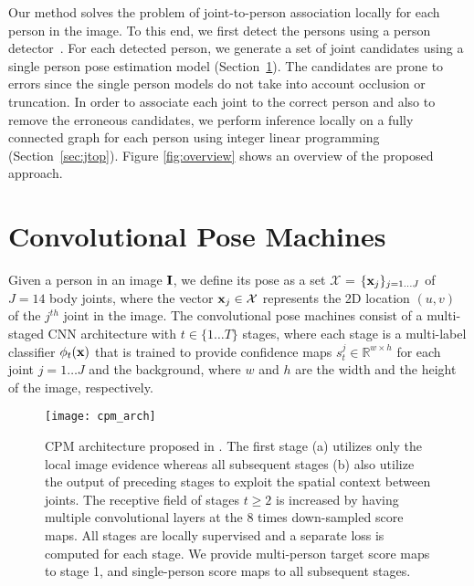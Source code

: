 \documentclass[runningheads]{llncs}
\begin{document}
Our method solves the problem of joint-to-person association locally for each person in the image. To this end, we first detect the persons using a person detector~\cite{ren2015faster}. For each detected person, we generate a set of joint candidates using a single person pose estimation model (Section~\ref{sec:cpm}). The candidates are prone to errors since the single person models do not take into account occlusion or truncation. In order to associate each joint to the correct person and also to remove the erroneous candidates, we perform inference locally on a fully connected graph for each person using integer linear programming (Section~\ref{sec:jtop}). Figure \ref{fig:overview} shows an overview of the proposed approach.

\section{Convolutional Pose Machines}
\label{sec:cpm}

Given a person in an image $\bold{I}$, we define its pose as a set $\mathcal{X}$ = $\{\bold{x}_j\}_{j = 1 \dots J}$ of $J=14$ body joints, where the vector $\bold{x}_j \in \mathcal{X}$ represents the 2D location $(u,v)$ of the $j^{th}$ joint in the image. The convolutional pose machines consist of a multi-staged CNN architecture with $t \in \{1 \dots T\}$ stages, where each stage is a multi-label classifier $\phi_{t}(\bold{x})$ that is trained to provide confidence maps $s^j_t \in \mathbb{R}^{w \times h}$ for each joint $j = 1 \dots J$ and the background, where $w$ and $h$ are the width and the height of the image, respectively.
 
\begin{figure*}[t!]
\centering
\captionsetup[figure]{skip=0pt}
\texttt{[image: cpm\_arch]}
\caption{CPM architecture proposed in \cite{wei2016convolutional}. The first stage (a) utilizes only the local image evidence whereas all subsequent stages (b) also utilize the output of preceding stages to exploit the spatial context between joints. The receptive field of stages $ t \geq 2 $ is increased by having multiple convolutional layers at the $8$ times down-sampled score maps. All stages are locally supervised and a separate loss is computed for each stage. We provide multi-person target score maps to stage 1, and single-person score maps to all subsequent stages.}
\label{fig:cpm_arch}
\end{figure*}
\end{document}
